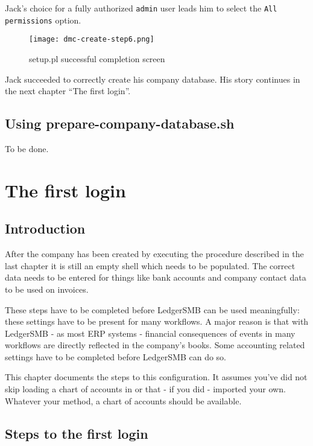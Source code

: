 Jack's choice for a fully authorized \texttt{admin} user leads him to select the
\texttt{All permissions} option.

\begin{figure}[h]
\centering
\texttt{[image: dmc-create-step6.png]}
\caption{setup.pl successful completion screen}
\label{fig:setup-step6}
\end{figure}

Jack succeeded to correctly create his company database. His story continues in
the next chapter ``The first login''.

\section{Using prepare-company-database.sh}
\label{sec-create-using-command-line}


To be done.


\chapter{The first login}
\label{cha-first-login}

\section{Introduction}
\label{sec-first-login-introduction}

After the company has been created by executing the procedure described in the last
chapter it is still an empty shell which needs to be populated. The correct data
needs to be entered for things like bank accounts and company contact data to be used
on invoices.

These steps have to be completed before LedgerSMB can be used meaningfully: these
settings have to be present for many workflows. A major reason is that with LedgerSMB
- as most ERP systems - financial
consequences of events in many workflows are directly reflected in the company's books.
Some accounting related settings have to be completed before LedgerSMB can do so.

This chapter documents the steps to this configuration. It assumes you've did not skip
loading a chart of accounts in  or that - if you did -
imported your own. Whatever your method, a chart of accounts should be available.

\section{Steps to the first login}
\label{sec-first-login-ramp-up}

